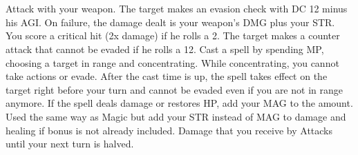 \documentclass[a4paper, titlepage, 11pt, twocolumn] {article}
\begin{document}
{\begin{multicols}{2}
{	}
	\end{multicols}
	{\vspace*{-0.4cm}\ofcsrulea}\vspace*{-0.7cm}\\
	\begin{multicols}{2}
	\columnbreak
	\end{multicols}
	{\vspace*{-0.4cm}\ofcsrulea}\vspace*{-0.9cm}\\
	\begin{multicols}{2}
	\hspace*{-0.3cm}
	\parbox{1.03\columnwidth}{
		\scriptsize
		\ofrow
		Attack with your weapon.
		The target makes an evasion check with DC 12 minus his AGI.
		On failure, the damage dealt is your weapon's DMG plus your STR.
		You score a critical hit (2x damage) if he rolls a 2.
		The target makes a counter attack that cannot be evaded if he rolls a 12.\ofrow
		 Cast a spell by spending MP, choosing a target in range and concentrating.
		While concentrating, you cannot take actions or evade. 
		After the cast time is up, the spell takes effect on the target right before your turn and cannot be evaded even if you are not in range anymore.
		If the spell deals damage or restores HP, add your MAG to the amount.\ofrow
		 Used the same way as Magic but add your STR instead of MAG to damage and healing if bonus is not already included.\ofrow
		 Damage that you receive by Attacks until your next turn is halved. \ofrow
}
\end{multicols}}
\end{document}
